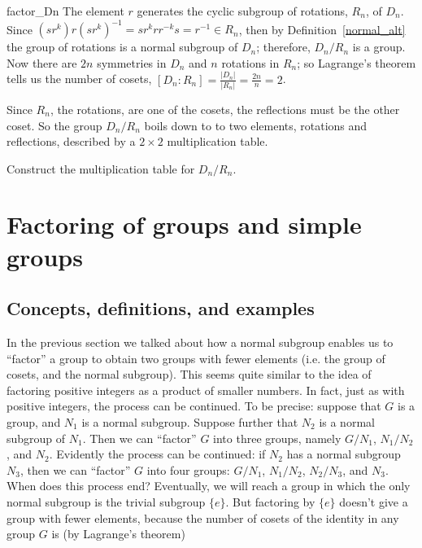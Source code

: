 {\begin{example}{factor_Dn}
The element $r$ generates the cyclic subgroup of rotations,
$R_n$, of $D_n$.  Since $(sr^k)r(sr^k)^{-1} = sr^krr^{-k}s = r^{-1} \in R_n$, then by Definition~\ref{normal_alt} the group
of rotations is a normal subgroup of $D_n$; therefore, $D_n / R_n$ is
a group.  Now there are $2n$ symmetries in $D_n$ and $n$ rotations in $R_n$; so Lagrange's theorem tells us the number of cosets, $[D_n : R_n] =  \frac{|D_n|}{|R_n|} = \frac{2n}{n} =2$.  

Since $R_n$, the rotations, are one of the cosets, the reflections must be the other coset.  So the group $D_n / R_n$ boils down to to two elements, rotations and reflections, described by a $2 \times 2$ multiplication table.  
\end{example}

\begin{exercise}{}
Construct the multiplication table for  $D_n / R_n$. 
\end{exercise}


 
\section{Factoring of groups and simple groups}\label{normal:section:simplealternating}
 
\subsection{Concepts, definitions, and examples}
 In the previous section we talked about how a normal subgroup enables us to ``factor'' a group to obtain two groups with fewer elements (i.e. the group of cosets, and the normal subgroup). This seems quite similar to the idea of factoring positive integers as a product of smaller numbers. In fact, just as with positive integers, the process can be continued. To be precise: suppose that $G$ is a group, and $N_1$ is a normal subgroup. Suppose further that $N_2$ is a normal subgroup of $N_1$.  Then we can ``factor'' $G$ into three groups, namely $G/N_1$, $N_1/N_2$, and $N_2$. Evidently the process can be continued: if $N_2$ has a normal subgroup $N_3$, then we can ``factor'' $G$ into four groups: $G/N_1$, $N_1/N_2$, $N_2/N_3$, and $N_3$.  When does this process end? Eventually, we will reach a group in which the only normal subgroup is the trivial subgroup  $\{e\}$.  But factoring by $\{e\}$ doesn't give a group with fewer elements, because the number of cosets of the identity in any group $G$ is (by Lagrange's theorem)

}
